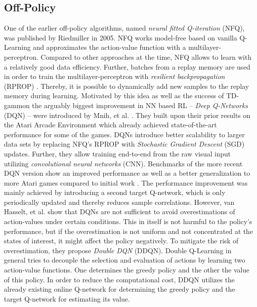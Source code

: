  	\subsection{Off-Policy}
	\label{sec:off-policy}
	One of the earlier off-policy algorithms, named \textit{neural fitted Q-iteration} (NFQ), was published by Riedmiller \cite{Riedmiller2005} in 2005. 
	NFQ works model-free based on vanilla Q-Learning \cite{Watkins1989} and approximates the action-value function with a multilayer-perceptron.
	Compared to other approaches at the time, NFQ allows to learn with a relatively good data efficiency.
	Further, batches from a replay memory \cite{Lin1992} are used in order to train the multilayer-perceptron with \textit{resilient backpropagation} (RPROP) \cite{Riedmiller1993}.
	Thereby, it is possible to dynamically add new samples to the replay memory during learning.
	Motivated by this idea as well as the success of TD-gammon \cite{Tesauro1994} the arguably biggest improvement in NN based RL -- \textit{Deep Q-Networks} (DQN) -- were introduced by Mnih, et al. \cite{Mnih2015}.   
	They built upon their prior results \cite{Mnih2013} on the Atari Arcade Environment \cite{Bellemare2013} which already achieved state-of-the-art performance for some of the games.
	DQNs introduce better scalability to larger data sets by replacing NFQ's RPROP with \textit{Stochastic Gradient Descent} (SGD) updates. 
	Further, they allow training end-to-end from the raw visual input utilizing \textit{convolutional neural networks} (CNN). 
	Benchmarks of the more recent DQN version \cite{Mnih2015} show an improved performance as well as a better generalization to more Atari games compared to initial work \cite{Mnih2013}.
	The performance improvement was mainly achieved by introducing a second target Q-network, which is only periodically updated and thereby reduces sample correlations. 
	However, van Hasselt, et al. \cite{VanHasselt2016} show that DQNs \cite{Mnih2015} are not sufficient to avoid overestimations of action-values under certain conditions. 
	This in itself is not harmful to the policy's performance, but if the overestimation is not uniform and not concentrated at the states of interest, it might affect the policy negatively. 
	To mitigate the risk of overestimation, they propose \textit{Double DQN} (DDQN).
	Double Q-Learning in general tries to decouple the selection and evaluation of actions by learning two action-value functions. 
	One determines the greedy policy and the other the value of this policy.  
	In order to reduce the computational cost, DDQN utilizes the already existing online Q-network for determining the greedy policy and the target Q-network for estimating its value. 
